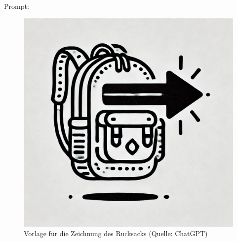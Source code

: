 \documentclass[
	12pt,
	a4paper,
	bibtotoc,
	cleardoubleempty, 
	idxtotoc,
	ngerman,
	openright
	final,
	listof=nochaptergap,
	]{scrbook}
\begin{document}
\begin{appendices}
Prompt: 

\begin{figure}[ht]
\centering
\includegraphics[width=1\linewidth]{content/attachments/vorlagen/Vorlage_Rucksack.png}
\caption{Vorlage für die Zeichnung des Rucksacks (Quelle: ChatGPT)}
\label{fig:vorlage_rucksack}
\end{figure}
\clearpage


\end{appendices}
\end{document}
